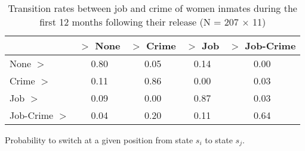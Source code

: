\begin{table}[htp]
\footnotesize
\setlength{\tabcolsep}{10pt}
\renewcommand{\arraystretch}{1.3}
\begin{threeparttable}
\centering
\caption{Transition rates between job and crime of women inmates \newline
    during the first 12 months following their release (N = 207 $\times$ 11)} 
\label{tab:transition_rates_anyjob_crime}
\begin{tabular}{lcccc}
  \hline
 & $>$ None & $>$ Crime & $>$ Job & $>$ Job-Crime \\ 
  \hline
None $>$ & 0.80 & 0.05 & 0.14 & 0.00 \\ 
  Crime $>$ & 0.11 & 0.86 & 0.00 & 0.03 \\ 
  Job $>$ & 0.09 & 0.00 & 0.87 & 0.03 \\ 
  Job-Crime $>$ & 0.04 & 0.20 & 0.11 & 0.64 \\ 
   \hline
\end{tabular}
\begin{tablenotes}
\scriptsize
\item Probability to switch at a given position from state $s_i$ to state $s_j$.
\end{tablenotes}
\end{threeparttable}
\end{table}
